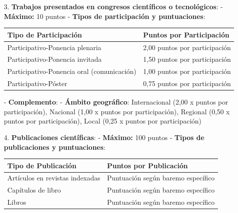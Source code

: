 \documentclass{article}
\begin{document}
\begin{itemize}
\begin{itemize}
                        3. \textbf{Trabajos presentados en congresos científicos o tecnológicos}:
                        - \textbf{Máximo:} 10 puntos
                        - \textbf{Tipos de participación y puntuaciones}:
                        \vspace{0.4cm}
                        \begin{table}[h!]\centering\renewcommand{\arraystretch}{1.3}
                              \begin{tabular}{|p{}|p{}|}\hline
                                    Tipo de Participación                      & Puntos por Participación      \\\hline
                                    Participativo-Ponencia plenaria            & 2,00 puntos por participación \\\hline
                                    Participativo-Ponencia invitada            & 1,50 puntos por participación \\\hline
                                    Participativo-Ponencia oral (comunicación) & 1,00 puntos por participación \\\hline
                                    Participativo-Póster                       & 0,75 puntos por participación \\\hline
                              \end{tabular}\end{table}
                        \vspace{0.4cm}
                        - \textbf{Complemento}:
                        - \textbf{Ámbito geográfico}: Internacional (2,00 x puntos por participación), Nacional (1,00 x puntos por participación), Regional (0,50 x puntos por participación), Local (0,25 x puntos por participación)

                        4. \textbf{Publicaciones científicas}:
                        - \textbf{Máximo:} 100 puntos
                        - \textbf{Tipos de publicaciones y puntuaciones}:
                        \vspace{0.4cm}
                        \begin{table}[h!]\centering\renewcommand{\arraystretch}{1.3}
                              \begin{tabular}{|p{}|p{}|}\hline
                                    Tipo de Publicación             & Puntos por Publicación             \\\hline
                                    Artículos en revistas indexadas & Puntuación según baremo específico \\\hline
                                    Capítulos de libro              & Puntuación según baremo específico \\\hline
                                    Libros                          & Puntuación según baremo específico \\\hline
                              \end{tabular}\end{table}
                        \vspace{0.4cm}


\end{itemize}
\end{itemize}
\end{document}
